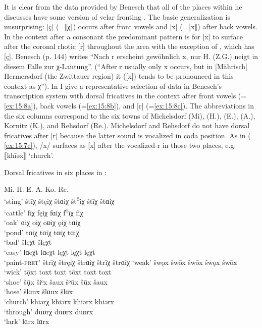{It is clear from the data provided by Benesch that all of the places within  he discusses have some version of velar fronting \citep[144--145]{Benesch1979}. The basic generalization is unsurprising: [ç] (=⟦χ⟧) occurs after front vowels and [x] (=⟦x⟧) after back vowels. In the context after a consonant the predominant pattern is for [x] to surface after the coronal rhotic [r] throughout the area with the exception of , which has [ç]. Benesch (p. 144) writes “Nach r erscheint gewöhnlich x, nur H. (Z.G.) neigt in diesem Falle zur χ{}-Lautung”. (“After r usually only x occurs, but in [Mährisch] Hermersdorf (the Zwittauer region) it ([x]) tends to be pronounced in this context as χ”). In  I give a representative selection of data in Benesch’s transcription system with dorsal fricatives in the context after front vowels (=\ref{ex:15:8a}), back vowels (=\ref{ex:15:8b}), and [r] (=\ref{ex:15:8c}). The abbreviations in the six columns correspond to the six towns of Michelsdorf (Mi),    (H.),  (E.),  (A.), Kornitz (K.), and Rehsdorf (Re.). Michelsdorf and Rehsdorf do not have dorsal fricatives after [r] because the latter sound is vocalized in coda position. As in  (=\ref{ex:15:7c}), /x/ surfaces as [x] after the vocalized-r in those two places, e.g. ⟦khīəx⟧ ‘church’.

\ea%
\label{ex:15:8}Dorsal fricatives in six places in :
\begin{xlist}
\sn[] \tab \tab Mi. \tab H. \tab E. \tab A. \tab Ko. \tab   Re.\\

\ex\label{ex:15:8a} ‘sting’ \tab štīχ \tab štęiχ \tab štɑiχ \tab št\textsuperscript{ō}iχ \tab štīχ \tab štɑiχ\\
‘cattle’ \tab fīχ \tab fęiχ \tab fɑiχ \tab f\textsuperscript{ö}īχ \tab fīχ\\
‘oak’ \tab ɑiχ \tab oiχ \tab oɒiχ \tab ǫiχ \tab  \tab tɑiχ\\
‘pond’ \tab tɑiχ \tab  \tab tɑiχ \tab tɑiχ \tab  \tab tɑiχ\\
‘bad’ \tab  \tab  \tab šlęχt \tab  \tab  \tab šlęχt\\
‘easy’ \tab lɑeχt \tab lɑeχt \tab lęχt \tab  \tab lęχt \tab lęχt\\
‘paint-\textsc{pret}’ \tab štrīχ \tab štręiχ \tab štrɑiχ \tab štrīχ \tab  \tab štrɑiχ
\ex\label{ex:15:8b} ‘weak’ \tab šwǫx \tab šwōx \tab šwōx \tab šwǫx \tab šwōx\\
‘wick’ \tab tọ̄xt \tab toxt \tab toxt \tab tōxt \tab toxt \tab toxt\\
‘shoe’ \tab šụ̄x \tab šiᵒx \tab šaux \tab šᵒūx \tab šūx \tab šaux\\
‘hose’ \tab šlɑux \tab  \tab  \tab  \tab šlɑux \tab šlɑx\\
\ex\label{ex:15:8c} ‘church’ \tab  \tab khiərχ \tab khiərx \tab khiərx \tab khiərx\\
‘through’ \tab  \tab duɒrχ \tab duɒrx \tab duɒrx\\
‘lark’ \tab  \tab lɑrx \tab lɑrx
\end{xlist} 
\z

}
